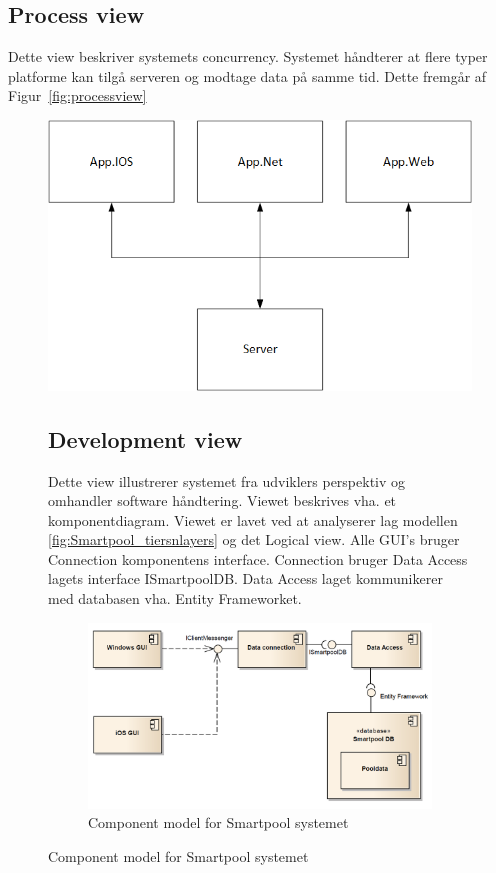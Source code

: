 \subsection{Process view}
Dette view beskriver systemets concurrency. Systemet håndterer at flere typer platforme kan tilgå serveren og modtage data på samme tid. Dette fremgår af Figur~\ref{fig:processview}
\begin{figure}
\centering
\includegraphics[width=0.7\linewidth]{figs/arkitektur/Processview.png}
\caption{Process view}
\label{fig:processview}

\subsection{Development view}
Dette view illustrerer systemet fra udviklers perspektiv og omhandler software håndtering. Viewet beskrives vha. et komponentdiagram. Viewet er lavet ved at analyserer lag modellen \ref{fig:Smartpool_tiersnlayers} og det Logical view. Alle GUI's bruger Connection komponentens interface. Connection bruger Data Access lagets interface ISmartpoolDB. Data Access laget kommunikerer med databasen vha. Entity Frameworket.

\begin{figure}
\centering
\includegraphics[width=0.7\linewidth]{figs/arkitektur/componentModel}
\caption{Component model for Smartpool systemet}
\label{fig:componentModel}
\end{figure}


\end{figure}
